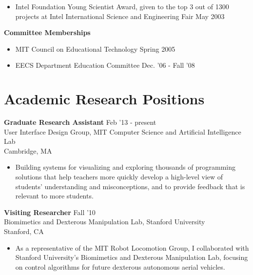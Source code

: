 \documentclass[margin]{res}
\begin{document}
\begin{resume}
\begin{itemize}
                 \item Intel Foundation Young Scientist Award, given to the top 3 out of 1300 projects at Intel International Science and Engineering Fair \hfill May 2003 
		 \end{itemize}


		 {\bf  Committee Memberships}  
                 \begin{itemize} \itemsep -2pt

               \item    MIT Council on Educational Technology \hfill Spring 2005 
                 
               \item  EECS Department Education Committee \hfill Dec. '06 - Fall '08
 \end{itemize}
		 


          

		
		 

\section{Academic Research Positions}

 {\bf Graduate Research Assistant} \hfill Feb '13 - present \\ User Interface Design Group, MIT Computer Science and Artificial Intelligence Lab \\ Cambridge, MA 
 \begin{itemize} \itemsep -2pt  %
 \item Building systems for visualizing and exploring thousands of programming solutions that help teachers more quickly develop a high-level view of students' understanding and misconceptions, and to provide feedback that is relevant to more students.
 \end{itemize}

 {\bf Visiting Researcher} \hfill Fall '10 \\Biomimetics and Dexterous Manipulation Lab, Stanford University  \\ Stanford, CA 
 \begin{itemize} \itemsep -2pt  %
\item As a representative of the MIT Robot Locomotion Group, I collaborated with Stanford University's Biomimetics and Dexterous Manipulation Lab, focusing on control algorithms for future dexterous autonomous aerial vehicles.
 \end{itemize}


\end{resume}
\end{document}
